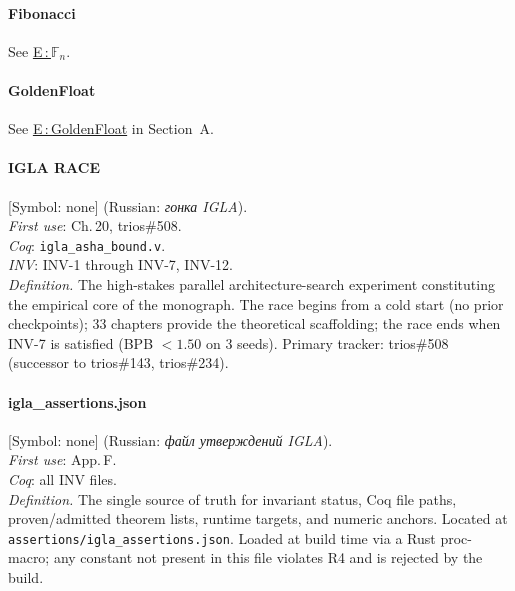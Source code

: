 \paragraph*{\textmd{\textbf{Fibonacci}}}
\quad See \hyperref[entry:fibonacci]{E\,:\,$\mathbb{F}_n$}.

\paragraph*{\textmd{\textbf{GoldenFloat}}}
\quad See \hyperref[entry:goldenfloat]{E\,:\,GoldenFloat} in Section~A.

\paragraph*{\textmd{\textbf{IGLA RACE}}}
\label{entry:igla-race}
[Symbol: none] (Russian: \textit{гонка IGLA}).\\
\textit{First use}: Ch.\,20, trios\#508.\\
\textit{Coq}: \texttt{igla\_asha\_bound.v}.\\
\textit{INV}: INV-1 through INV-7, INV-12.\\
\textit{Definition.}
The high-stakes parallel architecture-search experiment constituting the
empirical core of the monograph.
The race begins from a cold start (no prior checkpoints); 
33 chapters provide the theoretical scaffolding;
the race ends when INV-7 is satisfied (BPB $< 1.50$ on 3 seeds).
Primary tracker: trios\#508 (successor to trios\#143, trios\#234).

\paragraph*{\textmd{\textbf{igla\_assertions.json}}}
\label{entry:igla-json}
[Symbol: none] (Russian: \textit{файл утверждений IGLA}).\\
\textit{First use}: App.\,F.\\
\textit{Coq}: all INV files.\\
\textit{Definition.}
The single source of truth for invariant status, Coq file paths,
proven/admitted theorem lists, runtime targets, and numeric anchors.
Located at \texttt{assertions/igla\_assertions.json}.
Loaded at build time via a Rust proc-macro; any constant not present
in this file violates R4 and is rejected by the build.

